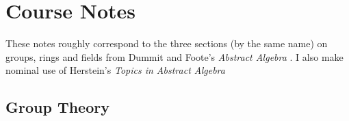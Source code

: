 \chapter{Course Notes}
\thispagestyle{empty}

These notes roughly correspond to the three sections (by the same name) on
groups, rings and fields from Dummit and Foote's \emph{Abstract Algebra}
\cite{dummit-foote:abstract-algebra}. I also make nominal use of Herstein's
\emph{Topics in Abstract Algebra} \cite{herstein:topics-in-algebra}

\section{Group Theory}


